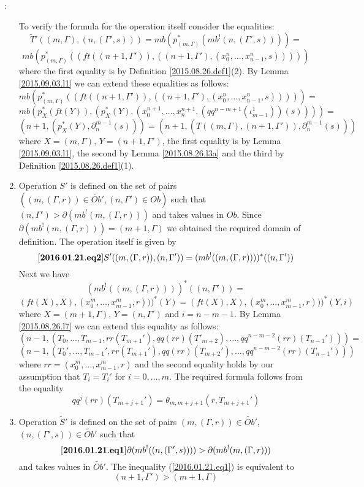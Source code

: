 \documentclass[11pt]{article}
\newenvironment{eq}{\begin{equation}}{\end{equation}}
\newenvironment{proof}{{\bf Proof}:}{\vskip 5mm }
\newcommand{\llabel}[1]{\label{#1}[{\bf #1}]}
\newcommand{\wt}{\widetilde}
\begin{document}
\begin{proof}
\begin{enumerate}
To verify the formula for the operation itself consider the equalities:
%
$$\wt{T}'((m,\Gamma),(n,(\Gamma',s)))=mb(p_{(m,\Gamma)}^*(mb^!(n,(\Gamma',s))))=$$
$$mb(p_{(m,\Gamma)}^*((ft((n+1,\Gamma')),((n+1,\Gamma'),(x^{n}_0,\dots,x^{n}_{n-1},s)))))$$
%
where the first equality is by Definition \ref{2015.08.26.def1}(2). By Lemma \ref{2015.09.03.l1} we can extend these equalities as follows:
%
$$mb(p_{(m,\Gamma)}^*((ft((n+1,\Gamma')),((n+1,\Gamma'),(x^{n}_0,\dots,x^{n}_{n-1},s)))))=$$
$$mb(p_{X}^*(ft(Y)),(p_{X}^*(Y),(x^{n+1}_0,\dots,x^{n+1}_{n},(qq^{n-m+1}(\iota^1_{m-1}))(s))))=$$
$$(n+1,(p_{X}^*(Y),\partial_{n}^{m-1}(s)))=(n+1,(T((m,\Gamma),(n+1,\Gamma')),\partial_n^{m-1}(s)))$$
%
where $X=(m,\Gamma)$, $Y=(n+1,\Gamma')$, the first equality is by Lemma \ref{2015.09.03.l1}, the second by Lemma \ref{2015.08.26.l3a} and the third by Definition \ref{2015.08.26.def1}(1). 
%
\item Operation $S'$ is defined on the set of pairs $((m,(\Gamma,r))\in \wt{Ob}',(n,\Gamma')\in Ob)$ such that $(n,\Gamma')>\partial(mb^!(m,(\Gamma,r)))$ and takes values in $Ob$. Since $\partial(mb^!(m,(\Gamma,r)))=(m+1,\Gamma)$ we obtained the required domain of definition. The operation itself is given by
%
\begin{eq}\llabel{2016.01.21.eq2}
S'((m,(\Gamma,r)),(n,\Gamma'))=(mb^!((m,(\Gamma,r))))^*((n,\Gamma'))
\end{eq}
%
Next we have 
%
$$(mb^!((m,(\Gamma,r))))^*((n,\Gamma'))=$$$$(ft(X),X),(x^{m}_0,\dots,x^{m}_{m-1},r)))^*(Y)=(ft(X),X),(x^{m}_0,\dots,x^{m}_{m-1},r)))^*(Y,i)$$
%
where $X=(m+1,\Gamma)$, $Y=(n,\Gamma')$ and $i=n-m-1$. By Lemma \ref{2015.08.26.l7} we can extend this equality as follows:
%
$$(n-1,(T_0,\dots,T_{m-1},rr(T_{m+1}'),qq(rr)(T'_{m+2}),\dots,qq^{n-m-2}(rr)(T_{n-1}')))=$$
$$(n-1,(T_0',\dots,T_{m-1}',rr(T_{m+1}'),qq(rr)(T_{m+2}'),\dots,qq^{n-m-2}(rr)(T_{n-1}')))$$
%
where $rr=(x^{m}_0,\dots,x^{m}_{m-1},r)$ and the second equality holds by our assumption that $T_i=T_i'$ for $i=0,\dots,m$. The required formula follows from the equality 
%
$$qq^j(rr)(T_{m+j+1}')=\theta_{m,m+j+1}(r,T_{m+j+1}')$$
%
\item Operation $\wt{S}'$ is defined on the set of pairs $(m,(\Gamma,r))\in \wt{Ob}'$, $(n,(\Gamma',s))\in \wt{Ob}'$ such that 
%
\begin{eq}\llabel{2016.01.21.eq1}
\partial(mb^!((n,(\Gamma',s))))>\partial(mb^!(m,(\Gamma,r)))
\end{eq}
%
and takes values in $\wt{Ob}'$. The inequality (\ref{2016.01.21.eq1}) is equivalent to 
%
$$(n+1,\Gamma')>(m+1,\Gamma)$$

\end{enumerate}
\end{proof}
\end{document}
